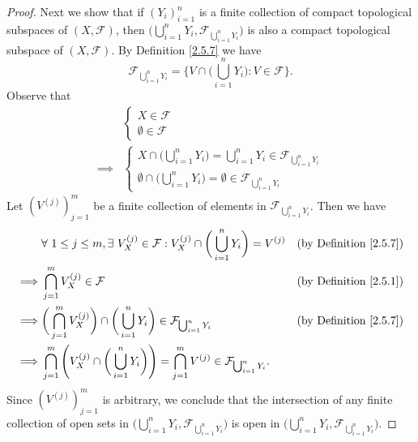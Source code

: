 \begin{proof}
    Next we show that if \((Y_i)_{i = 1}^n\) is a finite collection of compact topological subspaces of \((X, \mathcal{F})\), then \(\big(\bigcup_{i = 1}^n Y_i, \mathcal{F}_{\bigcup_{i = 1}^n Y_i}\big)\) is also a compact topological subspace of \((X, \mathcal{F})\).
    By Definition \ref{2.5.7} we have
    \[
        \mathcal{F}_{\bigcup_{i = 1}^n Y_i} = \bigg\{V \cap \bigg(\bigcup_{i = 1}^n Y_i\bigg) : V \in \mathcal{F}\bigg\}.
    \]
    Observe that
    \begin{align*}
                 & \begin{cases}
            X \in \mathcal{F} \\
            \emptyset \in \mathcal{F}
        \end{cases} \\
        \implies & \begin{cases}
            X \cap \bigg(\bigcup_{i = 1}^n Y_i\bigg) = \bigcup_{i = 1}^n Y_i \in \mathcal{F}_{\bigcup_{i = 1}^n Y_i} \\
            \emptyset \cap \bigg(\bigcup_{i = 1}^n Y_i\bigg) = \emptyset \in \mathcal{F}_{\bigcup_{i = 1}^n Y_i}
        \end{cases}
    \end{align*}
    Let \((V^{(j)})_{j = 1}^m\) be a finite collection of elements in \(\mathcal{F}_{\bigcup_{i = 1}^n Y_i}\).
    Then we have
    \begin{align*}
                 & \forall\ 1 \leq j \leq m, \exists\ V_X^{(j)} \in \mathcal{F} : V_X^{(j)} \cap \bigg(\bigcup_{i = 1}^n Y_i\bigg) = V^{(j)}                           & \text{(by Definition \ref{2.5.7})} \\
        \implies & \bigcap_{j = 1}^m V_X^{(j)} \in \mathcal{F}                                                                                                         & \text{(by Definition \ref{2.5.1})} \\
        \implies & \bigg(\bigcap_{j = 1}^m V_X^{(j)}\bigg) \cap \bigg(\bigcup_{i = 1}^n Y_i\bigg) \in \mathcal{F}_{\bigcup_{i = 1}^n Y_i}                              & \text{(by Definition \ref{2.5.7})} \\
        \implies & \bigcap_{j = 1}^m \Bigg(V_X^{(j)} \cap \bigg(\bigcup_{i = 1}^n Y_i\bigg)\Bigg) = \bigcap_{j = 1}^m V^{(j)} \in \mathcal{F}_{\bigcup_{i = 1}^n Y_i}.
    \end{align*}
    Since \((V^{(j)})_{j = 1}^m\) is arbitrary, we conclude that the intersection of any finite collection of open sets in \(\big(\bigcup_{i = 1}^n Y_i, \mathcal{F}_{\bigcup_{i = 1}^n Y_i}\big)\) is open in \(\big(\bigcup_{i = 1}^n Y_i, \mathcal{F}_{\bigcup_{i = 1}^n Y_i}\big)\).

\end{proof}
